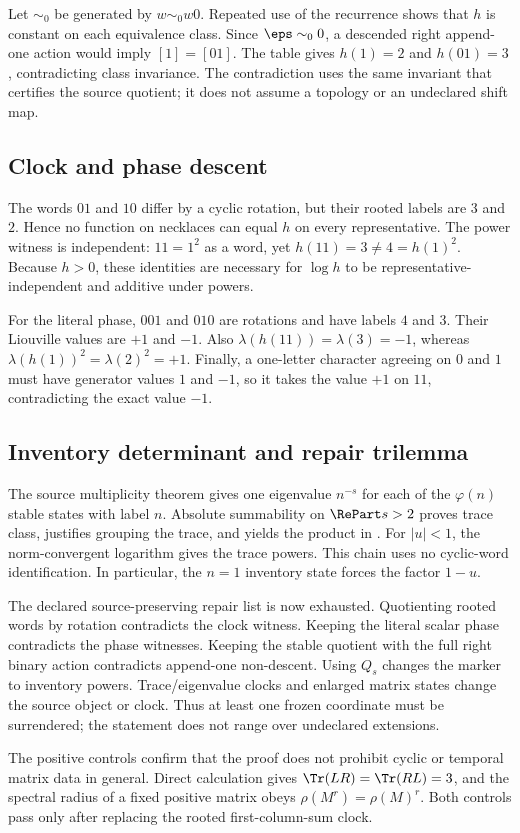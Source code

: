 Let $\sim_0$ be generated by $w\sim_0w0$.  Repeated use of the recurrence
shows that $h$ is constant on each equivalence class.  Since
$\eps\sim_00$, a descended right append-one action would imply
$[1]=[01]$.  The table gives $h(1)=2$ and $h(01)=3$, contradicting class
invariance.  The contradiction uses the same invariant that certifies the
source quotient; it does not assume a topology or an undeclared shift map.

\subsection{Clock and phase descent}

The words $01$ and $10$ differ by a cyclic rotation, but their rooted labels
are $3$ and $2$.  Hence no function on necklaces can equal $h$ on every
representative.  The power witness is independent: $11=1^2$ as a word, yet
$h(11)=3\ne4=h(1)^2$.  Because $h>0$, these identities are necessary for
$\log h$ to be representative-independent and additive under powers.

For the literal phase, $001$ and $010$ are rotations and have labels $4$ and
$3$.  Their Liouville values are $+1$ and $-1$.  Also
$\lambda(h(11))=\lambda(3)=-1$, whereas
$\lambda(h(1))^2=\lambda(2)^2=+1$.  Finally, a one-letter character agreeing
on $0$ and $1$ must have generator values $1$ and $-1$, so it takes the
value $+1$ on $11$, contradicting the exact value $-1$.

\subsection{Inventory determinant and repair trilemma}

The source multiplicity theorem gives one eigenvalue $n^{-s}$ for each of
the $\varphi(n)$ stable states with label $n$.  Absolute summability on
$\RePart s>2$ proves trace class, justifies grouping the trace, and yields the
product in .  For $|u|<1$, the norm-convergent
logarithm gives the trace powers.  This chain uses no cyclic-word
identification.  In particular, the $n=1$ inventory state forces the factor
$1-u$.

The declared source-preserving repair list is now exhausted.  Quotienting rooted words by
rotation contradicts the clock witness.  Keeping the literal scalar phase
contradicts the phase witnesses.  Keeping the stable quotient with the full
right binary action contradicts append-one non-descent.  Using $Q_s$ changes
the marker to inventory powers.  Trace/eigenvalue clocks and enlarged matrix
states change the source object or clock.  Thus at least one frozen
coordinate must be surrendered; the statement does not range over
undeclared extensions.

The positive controls confirm that the proof does not prohibit cyclic or
temporal matrix data in general.  Direct calculation gives
$\Tr(LR)=\Tr(RL)=3$, and the spectral radius of a fixed positive matrix obeys
$\rho(M^r)=\rho(M)^r$.  Both controls pass only after replacing the rooted
first-column-sum clock.
